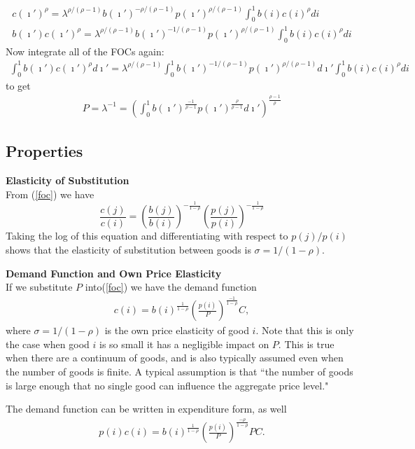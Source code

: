 \documentclass[11pt, pdftex]{article}
\newcommand{\sig}{\sigma}
\newcommand{\lam}{\lambda}
\begin{document}
\begin{align}
c(\imath ')^\rho=\lam^{\rho/(\rho-1)} b(\imath ')^{-\rho/(\rho-1)} p(\imath ')^{\rho/(\rho-1)} \int_0^1b(i)c(i)^\rho di \\
b(\imath ')c(\imath ')^\rho=\lam^{\rho/(\rho-1)} b(\imath ')^{-1/(\rho-1)} p(\imath ')^{\rho/(\rho-1)} \int_0^1b(i)c(i)^\rho di
\end{align}
 Now integrate all of the FOCs again:
\begin{align}
\int_0^1b(\imath ')c(\imath ')^\rho d\imath '=\lam^{\rho/(\rho-1)} \int_0^1b(\imath ')^{-1/(\rho-1)} p(\imath ')^{\rho/(\rho-1)}d\imath ' \int_0^1b(i)c(i)^\rho di
\end{align}
 to get
\begin{align}
P=\lam^{-1}= \left(\int_0^1b(\imath ')^{\frac{-1}{\rho-1}} p(\imath ')^{\frac{\rho}{\rho-1}}d\imath '\right)^{\frac{\rho-1}{\rho}} \label{price_index}
\end{align}

\subsection*{Properties}
\textbf{Elasticity of Substitution}\\
From (\ref{foc}) we have
\begin{equation}
\frac{c(j)}{c(i)}=\left(\frac{b(j)}{b(i)}\right)^{-\frac{1}{1-\rho}} \left(\frac{p(j)}{p(i)}\right)^{-\frac{1}{1-\rho}}
\end{equation}
Taking the log of this equation and differentiating with respect to $p(j)/p(i)$ shows that the elasticity of substitution between goods is $\sig=1/(1-\rho)$.

\textbf{Demand Function and Own Price Elasticity}\\
If we substitute $P$ into(\ref{foc}) we have the demand function
\begin{align}
c(i)=b(i)^{\frac{1}{1-\rho}}\left(\frac{p(i)}{P}\right)^{\frac{-1}{1-\rho}} C,
\end{align}
where $\sig=1/(1-\rho)$ is the own price elasticity of good $i$.  Note that this is only the case when good $i$ is so small it has a negligible impact on $P$.  This is true when there are a continuum of goods, and is also typically assumed even when the number of goods is finite.  A typical assumption is that ``the number of goods is large enough that no single good can influence the aggregate price level."

The demand function can be written in expenditure form, as well
\begin{align}
p(i)c(i)=b(i)^{\frac{1}{1-\rho}}\left(\frac{p(i)}{P}\right)^{\frac{-\rho}{1-\rho}} PC.
\end{align}
\end{document}
